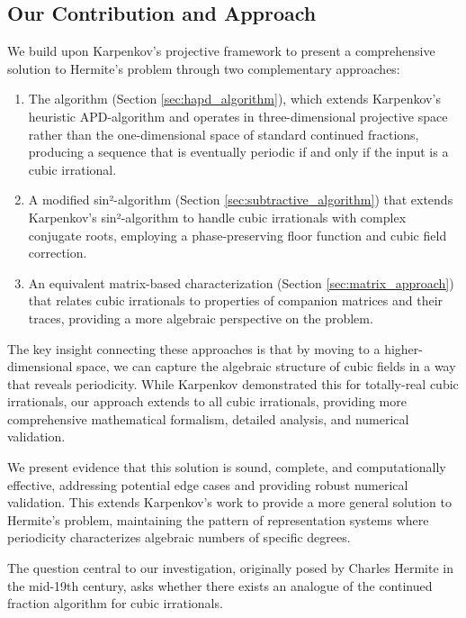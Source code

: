 \subsection{Our Contribution and Approach}

We build upon Karpenkov's projective framework to present a comprehensive solution to Hermite's problem through two complementary approaches:

\begin{enumerate}
    \item The \HAPD{} algorithm (Section \ref{sec:hapd_algorithm}), which extends Karpenkov's heuristic APD-algorithm and operates in three-dimensional projective space rather than the one-dimensional space of standard continued fractions, producing a sequence that is eventually periodic if and only if the input is a cubic irrational.
    
    \item A modified sin²-algorithm (Section \ref{sec:subtractive_algorithm}) that extends Karpenkov's sin²-algorithm to handle cubic irrationals with complex conjugate roots, employing a phase-preserving floor function and cubic field correction.
    
    \item An equivalent matrix-based characterization (Section \ref{sec:matrix_approach}) that relates cubic irrationals to properties of companion matrices and their traces, providing a more algebraic perspective on the problem.
\end{enumerate}

The key insight connecting these approaches is that by moving to a higher-dimensional space, we can capture the algebraic structure of cubic fields in a way that reveals periodicity. While Karpenkov demonstrated this for totally-real cubic irrationals, our approach extends to all cubic irrationals, providing more comprehensive mathematical formalism, detailed analysis, and numerical validation.

We present evidence that this solution is sound, complete, and computationally effective, addressing potential edge cases and providing robust numerical validation. This extends Karpenkov's work to provide a more general solution to Hermite's problem, maintaining the pattern of representation systems where periodicity characterizes algebraic numbers of specific degrees.

The question central to our investigation, originally posed by Charles Hermite in the mid-19th century, asks whether there exists an analogue of the continued fraction algorithm for cubic irrationals.

